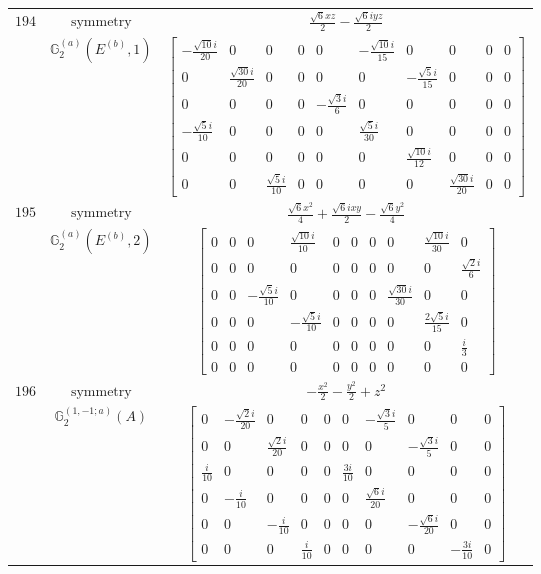 \documentclass[fleqn,8pt,landscape]{jsarticle}
\begin{document}
\begin{longtable}{ccc}
$ 194 $ & $ \text{symmetry} $ & $ \frac{\sqrt{6} x z}{2} - \frac{\sqrt{6} i y z}{2} $ \\
$  $ & $ \mathbb{G}_{2}^{(a)}(E^{(b)},1) $ & $ \begin{bmatrix} - \frac{\sqrt{10} i}{20} & 0 & 0 & 0 & 0 & - \frac{\sqrt{10} i}{15} & 0 & 0 & 0 & 0 \\ 0 & \frac{\sqrt{30} i}{20} & 0 & 0 & 0 & 0 & - \frac{\sqrt{5} i}{15} & 0 & 0 & 0 \\ 0 & 0 & 0 & 0 & - \frac{\sqrt{3} i}{6} & 0 & 0 & 0 & 0 & 0 \\ - \frac{\sqrt{5} i}{10} & 0 & 0 & 0 & 0 & \frac{\sqrt{5} i}{30} & 0 & 0 & 0 & 0 \\ 0 & 0 & 0 & 0 & 0 & 0 & \frac{\sqrt{10} i}{12} & 0 & 0 & 0 \\ 0 & 0 & \frac{\sqrt{5} i}{10} & 0 & 0 & 0 & 0 & \frac{\sqrt{30} i}{20} & 0 & 0 \end{bmatrix} $ \\ \hline
$ 195 $ & $ \text{symmetry} $ & $ \frac{\sqrt{6} x^{2}}{4} + \frac{\sqrt{6} i x y}{2} - \frac{\sqrt{6} y^{2}}{4} $ \\
$  $ & $ \mathbb{G}_{2}^{(a)}(E^{(b)},2) $ & $ \begin{bmatrix} 0 & 0 & 0 & \frac{\sqrt{10} i}{10} & 0 & 0 & 0 & 0 & \frac{\sqrt{10} i}{30} & 0 \\ 0 & 0 & 0 & 0 & 0 & 0 & 0 & 0 & 0 & \frac{\sqrt{2} i}{6} \\ 0 & 0 & - \frac{\sqrt{5} i}{10} & 0 & 0 & 0 & 0 & \frac{\sqrt{30} i}{30} & 0 & 0 \\ 0 & 0 & 0 & - \frac{\sqrt{5} i}{10} & 0 & 0 & 0 & 0 & \frac{2 \sqrt{5} i}{15} & 0 \\ 0 & 0 & 0 & 0 & 0 & 0 & 0 & 0 & 0 & \frac{i}{3} \\ 0 & 0 & 0 & 0 & 0 & 0 & 0 & 0 & 0 & 0 \end{bmatrix} $ \\ \hline
$ 196 $ & $ \text{symmetry} $ & $ - \frac{x^{2}}{2} - \frac{y^{2}}{2} + z^{2} $ \\
$  $ & $ \mathbb{G}_{2}^{(1,-1;a)}(A) $ & $ \begin{bmatrix} 0 & - \frac{\sqrt{2} i}{20} & 0 & 0 & 0 & 0 & - \frac{\sqrt{3} i}{5} & 0 & 0 & 0 \\ 0 & 0 & \frac{\sqrt{2} i}{20} & 0 & 0 & 0 & 0 & - \frac{\sqrt{3} i}{5} & 0 & 0 \\ \frac{i}{10} & 0 & 0 & 0 & 0 & \frac{3 i}{10} & 0 & 0 & 0 & 0 \\ 0 & - \frac{i}{10} & 0 & 0 & 0 & 0 & \frac{\sqrt{6} i}{20} & 0 & 0 & 0 \\ 0 & 0 & - \frac{i}{10} & 0 & 0 & 0 & 0 & - \frac{\sqrt{6} i}{20} & 0 & 0 \\ 0 & 0 & 0 & \frac{i}{10} & 0 & 0 & 0 & 0 & - \frac{3 i}{10} & 0 \end{bmatrix} $ \\ \hline

\end{longtable}
\end{document}
